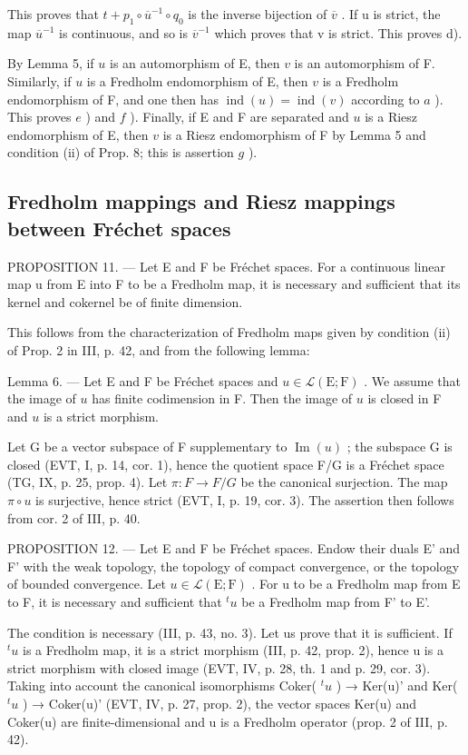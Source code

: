 This proves that \(t + p_{1} \circ \overline{u}^{-1} \circ q_{0}\) is the inverse bijection of \(\overline{v}\) . If u is strict, the map \(\overline{u}^{-1}\) is continuous, and so is \(\overline{v}^{-1}\) which proves that v is strict. This proves d).

By Lemma 5, if \(u\) is an automorphism of E, then \(v\) is an automorphism of F. Similarly, if \(u\) is a Fredholm endomorphism of E, then \(v\) is a Fredholm endomorphism of F, and one then has \(\operatorname{ind}(u) = \operatorname{ind}(v)\) according to \(a\) ). This proves \(e\) ) and \(f\) ). Finally, if E and F are separated and \(u\) is a Riesz endomorphism of E, then \(v\) is a Riesz endomorphism of F by Lemma 5 and condition (ii) of Prop. 8; this is assertion \(g\) ).

\subsection{Fredholm mappings and Riesz mappings between Fréchet spaces}

PROPOSITION 11. --- Let E and F be Fréchet spaces. For a continuous linear map u from E into F to be a Fredholm map, it is necessary and sufficient that its kernel and cokernel be of finite dimension.

This follows from the characterization of Fredholm maps given by condition (ii) of Prop. 2 in III, p. 42, and from the following lemma:

Lemma 6. --- Let E and F be Fréchet spaces and \(u \in \mathcal{L}(\mathrm{E};\mathrm{F})\) . We assume that the image of \(u\) has finite codimension in F. Then the image of \(u\) is closed in F and \(u\) is a strict morphism.

Let G be a vector subspace of F supplementary to \(\operatorname{Im}(u)\) ; the subspace G is closed (EVT, I, p. 14, cor. 1), hence the quotient space F/G is a Fréchet space (TG, IX, p. 25, prop. 4). Let \(\pi: F \to F/G\) be the canonical surjection. The map \(\pi \circ u\) is surjective, hence strict (EVT, I, p. 19, cor. 3). The assertion then follows from cor. 2 of III, p. 40.

PROPOSITION 12. --- Let E and F be Fréchet spaces. Endow their duals E' and F' with the weak topology, the topology of compact convergence, or the topology of bounded convergence. Let \(u \in \mathcal{L}(\mathrm{E};\mathrm{F})\) . For u to be a Fredholm map from E to F, it is necessary and sufficient that \({}^{t}u\) be a Fredholm map from F' to E'.

The condition is necessary (III, p. 43, no. 3). Let us prove that it is sufficient. If \(^{t}u\) is a Fredholm map, it is a strict morphism (III, p. 42, prop. 2), hence u is a strict morphism with closed image (EVT, IV, p. 28, th. 1 and p. 29, cor. 3). Taking into account the canonical isomorphisms Coker( \(^{t}u\) ) → Ker(u)' and Ker( \(^{t}u\) ) → Coker(u)' (EVT, IV, p. 27, prop. 2), the vector spaces Ker(u) and Coker(u) are finite-dimensional and u is a Fredholm operator (prop. 2 of III, p. 42).

